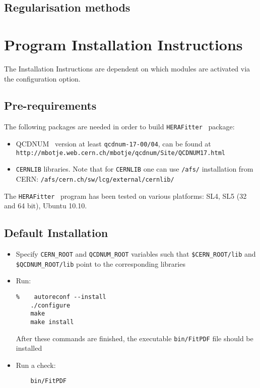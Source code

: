 \documentclass[11pt,a4paper]{article}
\newcommand\fitter{ \mbox{\tt HERAFitter} }
\begin{document}
\subsection{Regularisation methods}

\section{Program Installation Instructions} 
\label{sec:install}

The Installation Instructions are dependent on which modules are activated via the configuration option. 
\subsection{Pre-requirements}

The following packages are needed in order to build \fitter\ package:
\begin{itemize}
\item QCDNUM~\cite{qcdnum} version at least {\tt qcdnum-17-00/04}, can be found at \\
  {\tt http://mbotje.web.cern.ch/mbotje/qcdnum/Site/QCDNUM17.html}
\item {\tt CERNLIB} libraries. Note that for {\tt CERNLIB} one can use {\tt /afs/} installation from CERN:
  {\tt /afs/cern.ch/sw/lcg/external/cernlib/}
\end{itemize}
The \fitter\ program has been tested on various platforms: 
   SL4, SL5 (32 and 64 bit),  Ubuntu 10.10.
\subsection{Default Installation}
\begin{itemize}
\item
 Specify {\tt CERN\_ROOT} 
     and {\tt QCDNUM\_ROOT} variables such that 
     {\tt \$CERN\_ROOT/lib}  and {\tt \$QCDNUM\_ROOT/lib}
 point to the corresponding libraries
\item Run:
\begin{verbatim}
%    autoreconf --install
    ./configure
    make 
    make install
\end{verbatim}
After these commands are finished, the executable {\tt bin/FitPDF} 
file should be installed
\item  Run a check:
\begin{verbatim}
    bin/FitPDF 
\end{verbatim}
\end{itemize}
\end{document}
